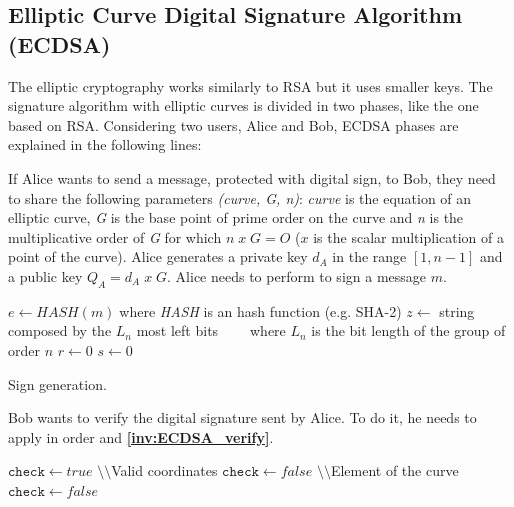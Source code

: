 \subsection{Elliptic Curve Digital Signature Algorithm (ECDSA)}
The elliptic cryptography works similarly to RSA but it uses smaller keys. The signature algorithm with elliptic curves is divided in two phases, like the one based on RSA. Considering two users, Alice and Bob, ECDSA phases are explained in the following lines:
\begin{itemize}
{If Alice wants to send a message, protected with digital sign, to Bob, they need to share the following parameters \textit{(curve, G, n)}: \textit{curve} is the equation of an elliptic curve, \textit{G} is the base point of prime order on the curve and \textit{n} is the multiplicative order of \textit{G} for which $n\; x\; G = O$ ($x$ is the scalar multiplication of a point of the curve).
Alice generates a private key $d_A$ in the range $[1, n-1]$ and a public key $Q_A=d_A\; x\; G$. Alice needs to perform  to sign a message $m$.
\begin{algorithm}[h]
\DontPrintSemicolon\footnotesize
{}
\BlankLine
$e\gets HASH(m)\;$where \textit{HASH} is an hash function (e.g. SHA-2)\;
\BlankLine
$z \gets$ string composed by the $L_n$ most left bits\;
$\;\;\;\;\;\;\;$where $L_n$ is the bit length of the group of order $n$\;
$r\gets 0$\;
$s\gets 0$\;
\BlankLine
{}
\caption{Sign generation.}\label{inv:ECDSA_sign}
\end{algorithm}
}
{Bob wants to verify the digital signature sent by Alice. To do it, he needs to apply in order  and \textbf{\ref{inv:ECDSA_verify}}.\\
\begin{algorithm}[h]
\DontPrintSemicolon\footnotesize
{}
\BlankLine
$\mathtt{check}\gets true$\;
\BlankLine
$\setminus\setminus$Valid coordinates\;
{	
$\mathtt{check}\gets false$\;
}
\BlankLine
$\setminus\setminus$Element of the curve\;
{	
$\mathtt{check}\gets false$\;
}
\end{algorithm}}
\end{itemize}
